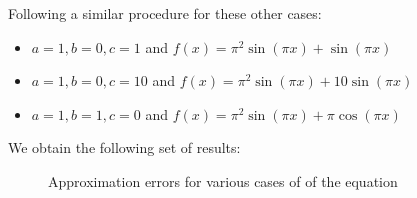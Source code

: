 Following a similar procedure for these other cases:
\begin{itemize}
    \item $a = 1, b = 0, c = 1$ and
          $f(x) = \pi^2\sin{(\pi x)} + \sin{(\pi x)}$ \\
    \item $a = 1, b = 0, c = 10$ and
          $f(x) = \pi^2\sin{(\pi x)} + 10\sin{(\pi x)}$ \\
    \item $a = 1, b = 1, c = 0$ and
          $f(x) = \pi^2\sin{(\pi x)} + \pi\cos{(\pi x)}$
\end{itemize}

We obtain the following set of results:

\begin{figure}
    
    \caption{Approximation errors for various cases of of the equation}
\end{figure}
